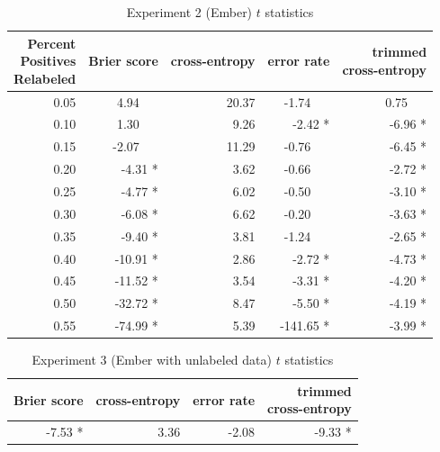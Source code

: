 \documentclass[conference]{IEEEtran}
\begin{document}
    \begin{table}[!h]
    \caption{Experiment 2 (Ember) $t$ statistics}
    \label{tab:exp2}
        \begin{tabular}{r | r | r | r | r}
            \hline
                \makecell{Percent \\ Positives \\ Relabeled}
                & Brier score & cross-entropy & error rate & \makecell{trimmed \\ cross-entropy} \\
            \hline                                                    
                0.05  &   4.94~~~  & 20.37 &   -1.74~~~  &  0.75~~~ \\
                0.10  &   1.30~~~  &  9.26 &   -2.42 *   & -6.96 * \\
                0.15  &  -2.07~~~  & 11.29 &   -0.76~~~  & -6.45 * \\
                0.20  &  -4.31 *   &  3.62 &   -0.66~~~  & -2.72 * \\
                0.25  &  -4.77 *   &  6.02 &   -0.50~~~  & -3.10 * \\
                0.30  &  -6.08 *   &  6.62 &   -0.20~~~  & -3.63 * \\
                0.35  &  -9.40 *   &  3.81 &   -1.24~~~  & -2.65 * \\
                0.40  & -10.91 *   &  2.86 &   -2.72 *   & -4.73 * \\
                0.45  & -11.52 *   &  3.54 &   -3.31 *   & -4.20 * \\
                0.50  & -32.72 *   &  8.47 &   -5.50 *   & -4.19 * \\
                0.55  & -74.99 *   &  5.39 & -141.65 *   & -3.99 *
        \end{tabular}
    \end{table}

    \begin{table}
    \caption{Experiment 3 (Ember with unlabeled data) $t$ statistics}
    \label{tab:exp3}
        \begin{tabular}{r | r | r | r}
            \hline
                Brier score & cross-entropy & error rate & \makecell{trimmed \\ cross-entropy} \\
            \hline                                                    
            -7.53 * & 3.36 & -2.08 & -9.33 *
        \end{tabular}
    \end{table}
\end{document}
